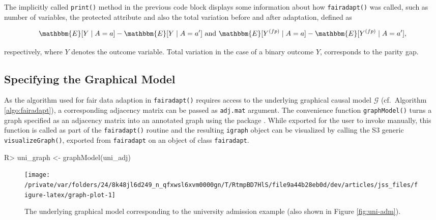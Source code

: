 \documentclass[
  nojss]{jss}
\begin{document}
The implicitly called \texttt{print()} method in the previous code block
displays some information about how \texttt{fairadapt()} was called,
such as number of variables, the protected attribute and also the total
variation before and after adaptation, defined as

\[\mathbbm{E}[Y \mid A = a] - \mathbbm{E}[Y \mid A = a'] \text{ and } \mathbbm{E}[ {Y}^{(fp)} \mid A = a] - \mathbbm{E}[ {Y}^{(fp)} \mid A = a'],\]

respectively, where \(Y\) denotes the outcome variable. Total variation
in the case of a binary outcome \(Y\), corresponds to the parity gap.

\hypertarget{specifying-the-graphical-model}{%
\subsection{Specifying the Graphical
Model}\label{specifying-the-graphical-model}}

As the algorithm used for fair data adaption in \texttt{fairadapt()}
requires access to the underlying graphical causal model \(\mathcal{G}\)
(cf.~Algorithm \ref{algo:fairadapt}), a corresponding adjacency matrix
can be passed as \texttt{adj.mat} argument. The convenience function
\texttt{graphModel()} turns a graph specified as an adjacency matrix
into an annotated graph using the  package
\citep{csardi2006igraph}. While exported for the user to invoke
manually, this function is called as part of the \texttt{fairadapt()}
routine and the resulting \texttt{igraph} object can be visualized by
calling the S3 generic \texttt{visualizeGraph()}, exported from
\texttt{fairadapt} on an object of class \texttt{fairadapt}.

\begin{CodeChunk}
\begin{CodeInput}
R> uni_graph <- graphModel(uni_adj)
\end{CodeInput}
\end{CodeChunk}

\begin{CodeChunk}
\begin{figure}

{\centering \texttt{[image: /private/var/folders/24/8k48jl6d249\_n\_qfxwsl6xvm0000gn/T/RtmpBD7HlS/file9a44b28eb0d/dev/articles/jss\_files/figure-latex/graph-plot-1]} 

}

\caption{The underlying graphical model corresponding to the university admission example (also shown in Figure \ref{fig:uni-adm}).}\label{fig:graph-plot}
\end{figure}
\end{CodeChunk}
\end{document}
